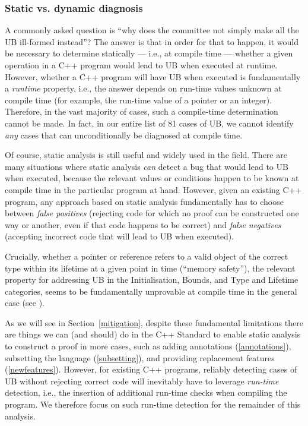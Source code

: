 \subsubsection{Static vs. dynamic diagnosis}
\label{statically}

A commonly asked question is ``why does the committee not simply make all the UB ill-formed instead''? The answer is that in order for that to happen, it would be necessary to determine statically --- i.e., at compile time --- whether a given operation in a C++ program would lead to UB when executed at runtime. However, whether a C++ program will have UB when executed is fundamentally a \emph{runtime} property, i.e., the answer depends on run-time values unknown at compile time (for example, the run-time value of a pointer or an integer). Therefore, in the vast majority of cases, such a compile-time determination cannot be made. In fact, in our entire list of 81 cases of UB, we cannot identify \emph{any} cases that can unconditionally be diagnosed at compile time.

Of course, static analysis is still useful and widely used in the field. There are many situations where static analysis \emph{can} detect a bug that would lead to UB when executed, because the relevant values or conditions happen to be known at compile time in the particular program at hand. However, given an existing C++ program, any approach based on static analysis fundamentally has to choose between \emph{false positives} (rejecting code for which no proof can be constructed one way or another, even if that code happens to be correct) and \emph{false negatives} (accepting incorrect code that will lead to UB when executed). 

Crucially, whether a pointer or reference refers to a valid object of the correct type within its lifetime at a given point in time (``memory safety''), the relevant property for addressing UB in the Initialisation, Bounds, and Type and Lifetime categories, seems to be fundamentally unprovable at compile time in the general case (see \cite{Baxter2024}).

As we will see in Section~\ref{mitigation}, despite these fundamental limitations there are things we can (and should) do in the C++ Standard to enable static analysis to construct a proof in more cases, such as adding annotations (\ref{annotations}), subsetting the language (\ref{subsetting}), and providing replacement features (\ref{newfeatures}). However, for existing C++ programs, reliably detecting cases of UB without rejecting correct code will inevitably have to leverage \emph{run-time} detection, i.e., the insertion of additional run-time checks when compiling the program. We therefore focus on such run-time detection for the remainder of this analysis.

